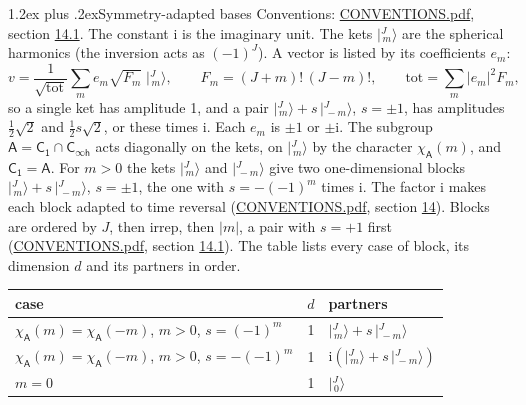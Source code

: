 \documentclass[10pt,a4paper]{article}
\makeatletter
\renewcommand\section{\@startsection{section}{1}{\z@}{-3ex plus -1ex minus -.2ex}%
  {1.2ex plus .2ex}{\normalfont\large\sffamily\bfseries\color{parttitle}}}
\numberwithin{equation}{section}
\newcommand{\grp}[1]{\mathsf{#1}}
\newcommand{\iunit}{\mathrm{i}}
\newcommand{\chiA}{\chi_{\grp{A}}}
\newcommand{\jm}[2]{\bigl\lvert{}^{#1}_{\,#2}\bigr\rangle}
\makeatother
\begin{document}
\section{Symmetry-adapted bases}\label{s:bases}
Conventions: \href{../../CONVENTIONS.pdf}{CONVENTIONS.pdf}, section \href{../../CONVENTIONS.pdf\#conv.14.1}{14.1}.
The constant $\iunit$ is the imaginary unit.
\leavevmode\label{n:index.m}\label{n:vector.ket}The kets $\jm{J}{m}$ are the spherical harmonics (the inversion acts as $(-1)^J$). \label{n:index.ketcoefficient}\label{n:vector.basis.symmetry}\label{n:index.ketweight}\label{n:index.total}A vector is listed by its coefficients $e_m$:
\begin{equation}\label{e:ket}v = \frac{1}{\sqrt{\mathrm{tot}}}\sum_m e_m\sqrt{F_m}\;\jm{J}{m},\qquad F_m = (J+m)!\,(J-m)!,\qquad \mathrm{tot} = \sum_m |e_m|^2F_m,\end{equation}
\leavevmode\label{n:index.pair.sign}so a single ket has amplitude 1, and a pair $\jm{J}{m} + s\,\jm{J}{-m}$, $s = \pm1$, has amplitudes $\tfrac{1}{2}\sqrt{2}$ and $\tfrac{1}{2}s\sqrt{2}$, or these times $\iunit$. Each $e_m$ is $\pm1$ or $\pm\iunit$.
\leavevmode\label{n:group.A}\label{n:function.character.abelian}The subgroup $\grp{A} = \grp{C_{1}}\cap\grp{C_{\infty h}}$ acts diagonally on the kets, on $\jm{J}{m}$ by the character $\chiA(m)$, and $\grp{C_{1}} = \grp{A}$. For $m > 0$ the kets $\jm{J}{m}$ and $\jm{J}{-m}$ give two one-dimensional blocks $\jm{J}{m} + s\,\jm{J}{-m}$, $s = \pm1$, the one with $s = -(-1)^m$ times $\iunit$. The factor $\iunit$ makes each block adapted to time reversal (\href{../../CONVENTIONS.pdf}{CONVENTIONS.pdf}, section \href{../../CONVENTIONS.pdf\#conv.14}{14}). Blocks are ordered by $J$, then irrep, then $|m|$, a pair with $s = +1$ first (\href{../../CONVENTIONS.pdf}{CONVENTIONS.pdf}, section \href{../../CONVENTIONS.pdf\#conv.14.1}{14.1}).
\leavevmode\label{n:head.case}\label{n:head.partners}The table lists every case of block, its dimension $d$ and its partners in order.
\begin{center}\begin{tabular}{@{}lrl@{}}\toprule
case & $d$ & partners\\\midrule
$\chiA(m) = \chiA(-m)$, $m > 0$, $s = (-1)^m$ & 1 & $\jm{J}{m} + s\,\jm{J}{-m}$\\
$\chiA(m) = \chiA(-m)$, $m > 0$, $s = -(-1)^m$ & 1 & $\iunit(\jm{J}{m} + s\,\jm{J}{-m})$\\
$m = 0$ & 1 & $\jm{J}{0}$\\
\bottomrule\end{tabular}\end{center}
\end{document}
